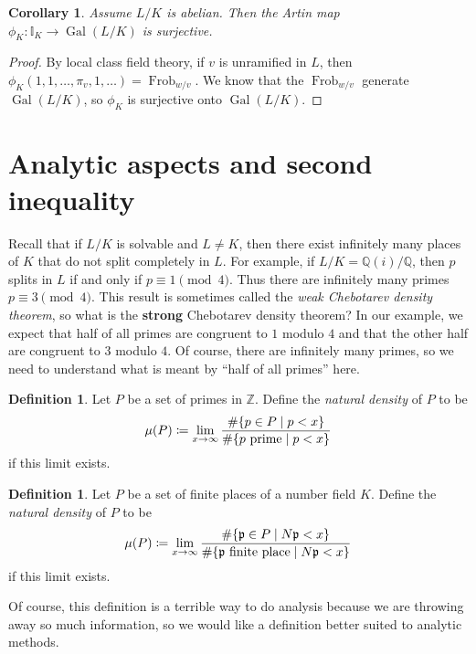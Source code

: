 \documentclass[leqno, openany]{memoir}
\newtheorem{cor}[thm]{Corollary}
\theoremstyle{definition}
\newtheorem{defn}[thm]{Definition}
\theoremstyle{remark}
\theoremstyle{plain}
\theoremstyle{definition}
\theoremstyle{remark}
\newcommand{\Z}{\mathbb{Z}}
\newcommand{\Q}{\mathbb{Q}}
\newcommand{\I}{\mathbb{I}}
\newcommand{\mf}[1]{\mathfrak{#1}}
\DeclareMathOperator{\Gal}{Gal}
\DeclareMathOperator{\Frob}{Frob}
\begin{document}
\begin{cor}
    Assume $L/K$ is abelian. Then the Artin map $\phi_K \colon \I_K \to \Gal(L/K)$ is surjective.
\end{cor}

\begin{proof}
    By local class field theory, if $v$ is unramified in $L$, then $\phi_K (1, 1, \ldots, \pi_v, 1, \ldots) = \Frob_{w/v}$. We know that the $\Frob_{w/v}$ generate $\Gal(L/K)$, so $\phi_K$ is surjective onto $\Gal(L/K)$.
\end{proof}

\section{Analytic aspects and second inequality}%
\label{sec:analytic_aspects_and_second_inequality}

Recall that if $L/K$ is solvable and $L \neq K$, then there exist infinitely many places of $K$ that do not split completely in $L$. For example, if $L/K = \Q(i)/\Q$, then $p$ splits in $L$ if and only if $p \equiv 1 \pmod{4}$. Thus there are infinitely many primes $p \equiv 3 \pmod{4}$. This result is sometimes called the \textit{weak Chebotarev density theorem}, so what is the \textbf{strong} Chebotarev density theorem? In our example, we expect that half of all primes are congruent to $1$ modulo $4$ and that the other half are congruent to $3$ modulo $4$. Of course, there are infinitely many primes, so we need to understand what is meant by ``half of all primes'' here.

\begin{defn}
    Let $P$ be a set of primes in $\Z$. Define the \textit{natural density} of $P$ to be
    \[ \mu(P) \coloneqq \lim_{x \to \infty} \frac{\# \qty{p \in P \mid p < x}}{\# \qty{p\ \text{prime} \mid p < x}} \]
    if this limit exists.
\end{defn}

\begin{defn}
    Let $P$ be a set of finite places of a number field $K$. Define the \textit{natural density} of $P$ to be
    \[ \mu(P) \coloneqq \lim_{x \to \infty} \frac{\# \qty{\mf{p} \in P \mid N \mf{p} < x}}{\# \qty{\mf{p}\ \text{finite place} \mid N \mf{p} < x}} \]
    if this limit exists.
\end{defn}

Of course, this definition is a terrible way to do analysis because we are throwing away so much information, so we would like a definition better suited to analytic methods.
\end{document}
